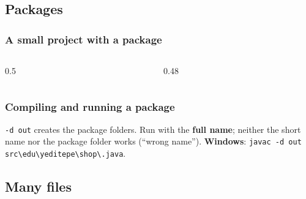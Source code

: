 \documentclass[aspectratio=169,10pt,compress]{beamer}
\newcommand{\win}{\textbf{Windows}}
\begin{document}

\subsection[Packages]{Packages}




\begin{frame}[t,fragile] \frametitle{A small project with a package}
  \begin{columns}[T]
    \begin{column}{0.5\textwidth}
    \end{column}
    \begin{column}{0.48\textwidth}
    \end{column}
  \end{columns}
\end{frame}




\begin{frame}[t,fragile] \frametitle{Compiling and running a package}

  \vspace{0.1em}
  \small
  \texttt{-d out} creates the package folders. Run with the \textbf{full name}; neither the short name nor
  the package folder works (``wrong name''). \win: \texttt{javac -d out src\textbackslash edu\textbackslash yeditepe\textbackslash shop\textbackslash *.java}.
\end{frame}

\subsection[Many files]{Many files}
\end{document}
